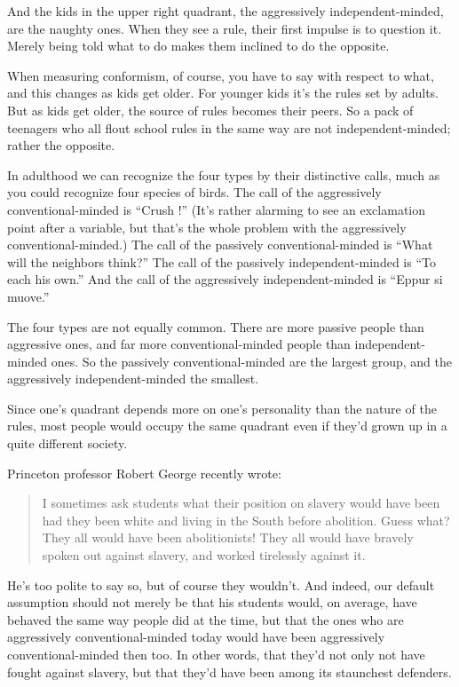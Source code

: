 \documentclass[12pt]{book}
\begin{document}
And the kids in the upper right quadrant, the aggressively
independent-minded, are the naughty ones. When they see a rule, their
first impulse is to question it. Merely being told what to do makes them
inclined to do the opposite.

When measuring conformism, of course, you have to say with respect to
what, and this changes as kids get older. For younger kids it's the
rules set by adults. But as kids get older, the source of rules becomes
their peers. So a pack of teenagers who all flout school rules in the
same way are not independent-minded; rather the opposite.

In adulthood we can recognize the four types by their distinctive calls,
much as you could recognize four species of birds. The call of the
aggressively conventional-minded is ``Crush !'' (It's rather alarming to
see an exclamation point after a variable, but that's the whole problem
with the aggressively conventional-minded.) The call of the passively
conventional-minded is ``What will the neighbors think?'' The call of
the passively independent-minded is ``To each his own.'' And the call of
the aggressively independent-minded is ``Eppur si muove.''

The four types are not equally common. There are more passive people
than aggressive ones, and far more conventional-minded people than
independent-minded ones. So the passively conventional-minded are the
largest group, and the aggressively independent-minded the smallest.

Since one's quadrant depends more on one's personality than the nature
of the rules, most people would occupy the same quadrant even if they'd
grown up in a quite different society.

Princeton professor Robert George recently wrote:

\begin{quote}
I sometimes ask students what their position on slavery would have been
had they been white and living in the South before abolition. Guess
what? They all would have been abolitionists! They all would have
bravely spoken out against slavery, and worked tirelessly against it.
\end{quote}

He's too polite to say so, but of course they wouldn't. And indeed, our
default assumption should not merely be that his students would, on
average, have behaved the same way people did at the time, but that the
ones who are aggressively conventional-minded today would have been
aggressively conventional-minded then too. In other words, that they'd
not only not have fought against slavery, but that they'd have been
among its staunchest defenders.
\end{document}

